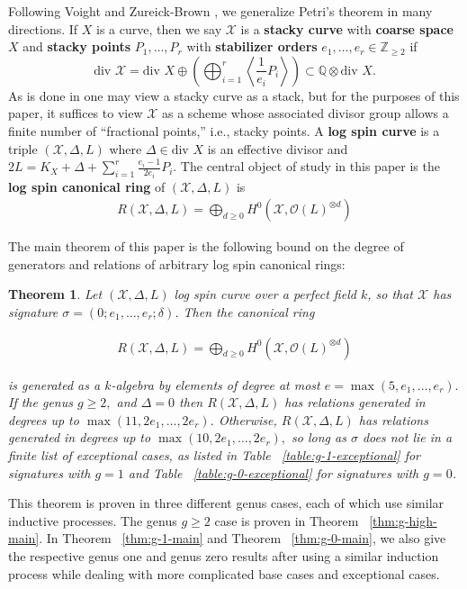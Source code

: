 \documentclass{amsart}
\theoremstyle{plain}
\newtheorem{thm}{Theorem}[section]
\theoremstyle{definition}
\theoremstyle{remark}
\numberwithin{equation}{section}
\newcommand\BQ{{\mathbb Q}}
\newcommand\BZ{{\mathbb Z}}
\newcommand \sx{\mathscr X}
\newcommand\sco{{\mathscr O}}
\newcommand \di{\text{div }}
\newcommand \subhalf[1]{\frac{{#1} - 1}{2{#1}}}
\newcommand \halfcan{L}
\begin{document}
Following Voight and Zureick-Brown \cite{vzb:stacky}, we generalize Petri's theorem in many
directions. 
If $X$ is a curve, then we say $\sx$ is a {\bf stacky curve} with {\bf coarse space} $X$ and {\bf stacky points} $P_1,\ldots, P_r$ with {\bf stabilizer orders} $e_1,\ldots, e_r \in \BZ_{\geq 2}$ if 
$$\di \sx = \di X \oplus \left(\bigoplus_{i
= 1}^r \left\langle \frac{1}{e_i}P_i \right\rangle \right) \subset \BQ \otimes \di X.$$
As is done in \cite{vzb:stacky} one may view a stacky curve as a stack, but for the purposes of this paper, it suffices to view $\sx$ as a scheme whose associated divisor group allows a finite number of ``fractional points,'' i.e., stacky points. A {\bf log spin curve} is a triple $(\sx, \Delta, \halfcan)$ where $\Delta \in \di X$ is an effective divisor and $2\halfcan = K_X + \Delta + \sum_{i=1}^{r}\subhalf{e_i}P_i.$
The central object of study in this paper is the {\bf log spin
canonical ring} of $(\sx,\Delta,L)$ is
\begin{align*}
	R(\sx,\Delta,L) = \bigoplus_{d \geq 0} H^0(\sx,\sco(L)^{\otimes d})
\end{align*}

\noindent
The main theorem of this paper is the following bound on the degree
of generators and relations of arbitrary log spin canonical rings:


\begin{thm}
\label{thm:main}
Let $(\sx, \Delta, \halfcan)$ log spin curve over a perfect field $k$, so
that $\sx$ has signature $\sigma = (0; e_1, \ldots, e_r; \delta)$. Then the
canonical ring

\begin{align*}
	R(\sx, \Delta, \halfcan) = \bigoplus_{d \geq 0} H^0(\sx, \sco(L)^{\otimes d})
\end{align*}

\noindent
is generated as a $k$-algebra by elements of degree at most $e =
\max(5, e_1, \ldots, e_r).$ If the genus $g \geq 2,$ and $\Delta = 0
$ then $R(\sx,\Delta, \halfcan)$ has relations generated in degrees
up to $\max(11, 2e_1, \ldots, 2e_r)$. Otherwise, $R(\sx, \Delta,
\halfcan)$ has relations generated in degrees up to $\max(10, 2e_1,
\ldots, 2e_r),$ so long as $\sigma$ does not lie in a finite list
of exceptional cases, as listed in Table ~\ref{table:g-1-exceptional}
for signatures with $g = 1$ and Table ~\ref{table:g-0-exceptional}
for signatures with $g = 0$.
\end{thm}

This theorem is proven in three different genus cases, each of
which use similar inductive processes. The genus $g \geq 2$ case is
proven in Theorem ~\ref{thm:g-high-main}. In Theorem
~\ref{thm:g-1-main} and Theorem
~\ref{thm:g-0-main}, we also give the respective
genus one and genus zero results after using a similar induction
process while dealing with more complicated base cases and
exceptional cases.
\end{document}
